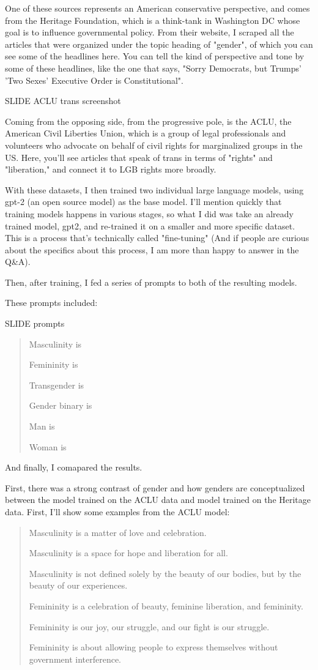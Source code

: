 \documentclass[11pt]{article}
\begin{document}
One of these sources represents an American conservative perspective,
and comes from the Heritage Foundation, which is a think-tank in
Washington DC whose goal is to influence governmental policy. From
their website, I scraped all the articles that were organized under
the topic heading of "gender", of which you can see some of the
headlines here. You can tell the kind of perspective and tone by some
of these headlines, like the one that says, "Sorry Democrats, but
Trumps' 'Two Sexes' Executive Order is Constitutional".

SLIDE ACLU trans screenshot

Coming from the opposing side, from the progressive pole, is the ACLU,
the American Civil Liberties Union, which is a group of legal
professionals and volunteers who advocate on behalf of civil rights
for marginalized groups in the US. Here, you'll see articles that
speak of trans in terms of "rights" and "liberation," and connect it
to LGB rights more broadly.

With these datasets, I then trained two individual large language
models, using gpt-2 (an open source model) as the base model. I'll
mention quickly that training models happens in various stages, so
what I did was take an already trained model, gpt2, and re-trained it
on a smaller and more specific dataset. This is a process that's
technically called "fine-tuning" (And if people are curious about the
specifics about this process, I am more than happy to answer in the
Q\&A).

Then, after training, I fed a series of prompts to both of the
resulting models.

These prompts included:

SLIDE prompts

\begin{quote}
Masculinity is

Femininity is

Transgender is

Gender binary is

Man is

Woman is
\end{quote}

And finally, I comapared the results.

First, there was a strong contrast of gender and how genders are
conceptualized between the model trained on the ACLU data and model
trained on the Heritage data. First, I'll show some examples from the
ACLU model:

\begin{quote}
Masculinity is a matter of love and celebration.

Masculinity is a space for hope and liberation for all.

Masculinity is not defined solely by the beauty of our bodies, but by
the beauty of our experiences.

Femininity is a celebration of beauty, feminine liberation, and
femininity.

Femininity is our joy, our struggle, and our fight is our struggle.

Femininity is about allowing people to express themselves without
government interference.
\end{quote}
\end{document}
